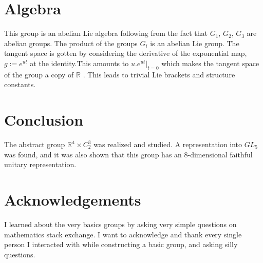 \documentclass{article}
\begin{document}
\section{Algebra}
    This group is an abelian Lie algebra following from the fact that $G_1$, $G_2$,  $G_3$ are abelian groups. The product of the groups $G_i$ is an abelian Lie group. The tangent space is gotten by considering the derivative of the exponential map, $g:= e^{ut}$ at the identity.This amounts to  $u. e^{u t}|_{t=0}$ which makes the tangent space of the group a copy of $\mathbb{R}$ \cite{4500869}. This  leads to trivial Lie brackets and structure constants.

\section{Conclusion}
 The abstract group  $\mathbb{R^4} \times C_2^3$ was realized and studied. A representation into $GL_5$ was found, and it was also shown that this group has an  8-dimensional faithful unitary representation.
 
\section*{Acknowledgements}

I learned about the very basics groups by asking very simple questions on mathematics stack exchange. I want to acknowledge and thank every single person I interacted with while constructing a basic group, and asking silly questions.
 
\printbibliography
\end{document}
